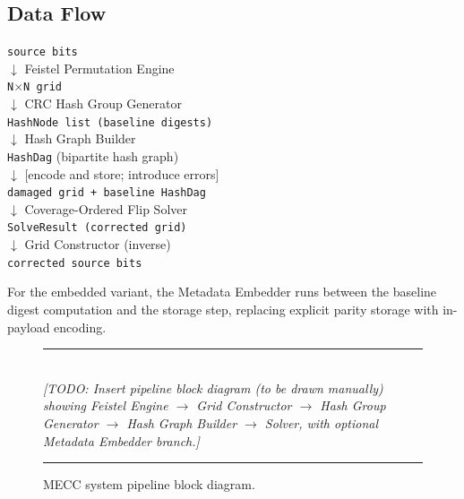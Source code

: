 \subsection*{Data Flow}

\begin{center}
\texttt{source bits}\\
$\downarrow$ Feistel Permutation Engine\\
\texttt{N$\times$N grid}\\
$\downarrow$ CRC Hash Group Generator\\
\texttt{HashNode list (baseline digests)}\\
$\downarrow$ Hash Graph Builder\\
\texttt{HashDag} (bipartite hash graph)\\
$\downarrow$ [encode and store; introduce errors]\\
\texttt{damaged grid + baseline HashDag}\\
$\downarrow$ Coverage-Ordered Flip Solver\\
\texttt{SolveResult (corrected grid)}\\
$\downarrow$ Grid Constructor (inverse)\\
\texttt{corrected source bits}
\end{center}

For the embedded variant, the Metadata Embedder runs between the baseline digest computation and the storage step, replacing explicit parity storage with in-payload encoding.

\begin{figure}[h]
\centering
\rule{0.85\textwidth}{0.4pt}\\[6pt]
\textit{[TODO: Insert pipeline block diagram (to be drawn manually) showing Feistel Engine $\to$ Grid Constructor $\to$ Hash Group Generator $\to$ Hash Graph Builder $\to$ Solver, with optional Metadata Embedder branch.]}\\[6pt]
\rule{0.85\textwidth}{0.4pt}
\caption{MECC system pipeline block diagram.}
\label{fig:pipeline}
\end{figure}
